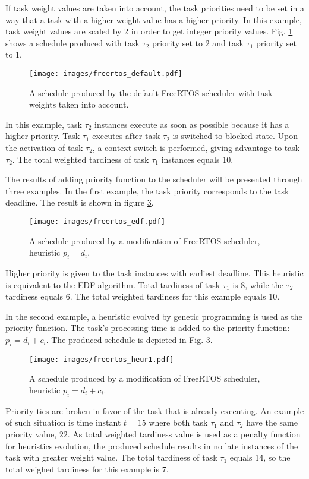 If task weight values are taken into account, the task priorities need to be set in a way that a task with a higher weight value has a higher priority.
In this example, task weight values are scaled by 2 in order to get integer priority values.
Fig. \ref{freertos_def_2} shows a schedule produced with task $\tau_2$ priority set to 2 and task $\tau_1$ priority set to 1. 
\begin{figure}[ht]
    \centering
    \texttt{[image: images/freertos\_default.pdf]}
    \caption{A schedule produced by the default FreeRTOS scheduler with task weights taken into account.}
    \label{freertos_def_2}
\end{figure}
In this example, task $\tau_2$ instances execute as soon as possible because it has a higher priority.
Task $\tau_1$ executes after task $\tau_2$ is switched to blocked state.
Upon the activation of task $\tau_2$, a context switch is performed, giving advantage to task $\tau_2$.
The total weighted tardiness of task $\tau_1$ instances equals 10.

The results of adding priority function to the scheduler will be presented through three examples.
In the first example, the task priority corresponds to the task deadline.
The result is shown in figure \ref{freertos_1}. 
\begin{figure}[ht]
    \centering
    \texttt{[image: images/freertos\_edf.pdf]}
    \caption{A schedule produced by a modification of FreeRTOS scheduler, heuristic $p_i = d_i$.}
    \label{freertos_edf}
\end{figure}
Higher priority is given to the task instances with earliest deadline.
This heuristic is equivalent to the EDF algorithm.
Total tardiness of task $\tau_1$ is 8, while the $\tau_2$ tardiness equals 6.
The total weighted tardiness for this example equals 10.

In the second example, a heuristic evolved by genetic programming is used as the priority function.
The task's processing time is added to the priority function: $p_i = d_i + c_i$.
The produced schedule is depicted in Fig. \ref{freertos_1}.
\begin{figure}[ht]
    \centering
    \texttt{[image: images/freertos\_heur1.pdf]}
    \caption{A schedule produced by a modification of FreeRTOS scheduler, heuristic $p_i = d_i + c_i$.}
    \label{freertos_1}
\end{figure}
Priority ties are broken in favor of the task that is already executing.
An example of such situation is time instant $t=15$ where both task $\tau_1$ and $\tau_2$ have the same priority value, $22$.
As total weighted tardiness value is used as a penalty function for heuristics evolution, the produced schedule results in no late instances of the task with greater weight value.
The total tardiness of task $\tau_1$ equals 14, so the total weighed tardiness for this example is 7.

